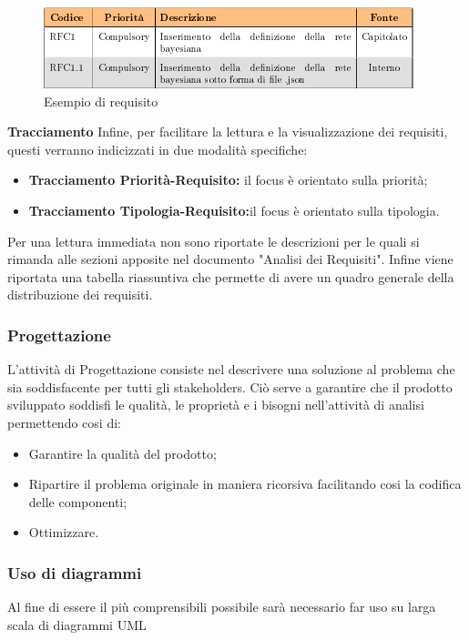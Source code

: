 	    \begin{figure}[!htbp]
	    	\centering
	    	\includegraphics{requisiti.png}
	    	\caption{Esempio di requisito}
	    \end{figure}
	    
	    \textbf{Tracciamento} Infine, per facilitare la lettura e la visualizzazione dei requisiti, questi verranno indicizzati in due modalità specifiche:
	    \begin{itemize}
	    	\item \textbf{Tracciamento Priorità-Requisito:} il focus è orientato sulla priorità;
	    	\item \textbf{Tracciamento Tipologia-Requisito:}il focus è orientato sulla tipologia.\newline
	    \end{itemize}
	    Per una lettura immediata non sono riportate le descrizioni per le quali si rimanda alle sezioni apposite nel documento "Analisi dei Requisiti".
	    Infine viene riportata una tabella riassuntiva che permette di avere un quadro generale della distribuzione dei requisiti.\newline
	    \subsubsection{Progettazione}
	    L'attività di Progettazione consiste nel descrivere una soluzione al problema che sia soddisfacente per tutti gli stakeholders\pedice. Ciò serve a garantire che il prodotto sviluppato soddisfi le qualità, le proprietà e i bisogni nell'attività di analisi permettendo cosi di:
	    \begin{itemize}
	        \item Garantire la qualità del prodotto;
	        \item Ripartire il problema originale in maniera ricorsiva facilitando cosi la codifica delle componenti;
	        \item Ottimizzare.
	    \end{itemize}	
	    \subsubsection{Uso di diagrammi}
	    Al fine di essere il più comprensibili possibile sarà necessario far uso su larga scala di diagrammi UML